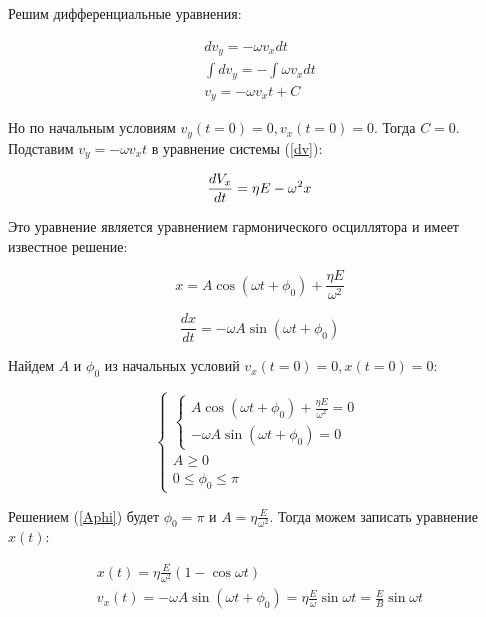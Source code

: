 Решим дифференциальные уравнения:

\begin{gather}
	\label{diff}
	 dv_y=-\omega{}v_x{}dt\\
	 \int dv_y=-\int\omega{}v_x{}dt\\
	 v_y=-\omega{}v_x{}t+C
\end{gather}

Но по начальным условиям $v_y(t=0)=0,v_x(t=0)=0$. Тогда $C=0$. Подставим $v_y=-\omega{}v_x{}t$ в уравнение системы (\ref{dv}):

\begin{equation}
	\frac{dV_x}{dt}=\eta{}E-\omega^2{}x\\
\end{equation}

Это уравнение является уравнением гармонического осциллятора и имеет известное решение:

\begin{equation}
	x=A\cos{(\omega{t}+\phi_0)}+\frac{\eta{E}}{\omega^2}
\end{equation}

\begin{equation}
	\frac{dx}{dt}=-\omega{A}\sin{(\omega{t}+\phi_0)}
\end{equation}

Найдем $A$ и $\phi_0$ из начальных условий $v_x(t=0)=0, x(t=0)=0$:

\begin{equation}
\label{Aphi}
 \begin{cases}
    \begin{cases}
   		A\cos{(\omega{t}+\phi_0)}+\frac{\eta{E}}{\omega^2}=0\\
   		-\omega{A}\sin{(\omega{t}+\phi_0)}=0
 	\end{cases}\\
 	A\geq0\\
 	0\leq\phi_0\leq\pi
 \end{cases}
\end{equation}

Решением (\ref{Aphi}) будет $\phi_0=\pi$ и $A=\eta\frac{E}{\omega^2}$. Тогда можем записать уравнение $x(t)$:

\begin{gather}
	\label{eq:x_t}
	x(t)=\eta\frac{E}{\omega^2}(1-\cos{\omega{t}})\\
	v_x(t)=-\omega{A}\sin{(\omega{t}+\phi_0)}=\eta\frac{E}{\omega}\sin{\omega{t}}=\frac{E}{B}\sin{\omega{t}}
\end{gather}

